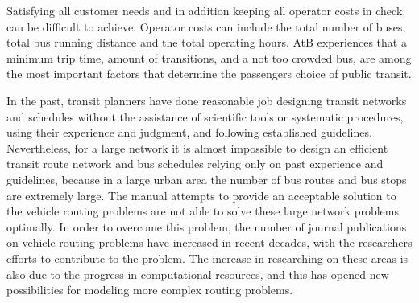 Satisfying all customer needs and in addition keeping all operator costs in check, can be difficult to achieve. Operator costs can include the total number of buses, total bus running distance and the total operating hours. AtB experiences that a minimum trip time, amount of transitions, and a not too crowded bus, are among the most important factors that determine the passengers choice of public transit.

In the past, transit planners have done reasonable job designing transit networks and schedules without the assistance of scientific tools or systematic procedures, using their experience and judgment, and following established guidelines. Nevertheless, for a large network it is almost impossible to design an efficient transit route network and bus schedules relying only on past experience and guidelines, because in a large urban area the number of bus routes and bus stops are extremely large. The manual attempts to provide an acceptable solution to the vehicle routing problems are not able to solve these large network problems optimally. In order to overcome this problem, the number of journal publications on vehicle routing problems have increased in recent decades, with the researchers efforts to contribute to the problem.  The increase in researching on these areas is also due to the progress in computational resources, and this has opened new possibilities for modeling more complex routing problems. %

